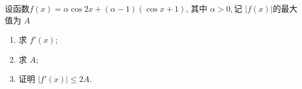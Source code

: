\documentclass[class=ctexart,crop=false]{standalone}
\begin{document}
    
设函数$f(x)=\alpha \cos 2x+(\alpha-1)(\cos x +1)$, 其中 $\alpha >0,$记 $|f(x)|$的最大值为 $A$

\begin{enumerate}[label=(\Roman*)]
    \item 求 $f'(x)$;
    \item 求 $A$;
    \item 证明 $|f'(x)|\leqslant 2A.$
\end{enumerate}
\end{document}
